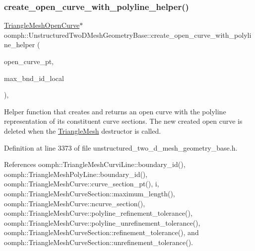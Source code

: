\subsubsection{\texorpdfstring{create\+\_\+open\+\_\+curve\+\_\+with\+\_\+polyline\+\_\+helper()}{create\_open\_curve\_with\_polyline\_helper()}}
{\footnotesize\ttfamily \hyperlink{classoomph_1_1TriangleMeshOpenCurve}{Triangle\+Mesh\+Open\+Curve}$\ast$ oomph\+::\+Unstructured\+Two\+D\+Mesh\+Geometry\+Base\+::create\+\_\+open\+\_\+curve\+\_\+with\+\_\+polyline\+\_\+helper (\begin{DoxyParamCaption}\item[{\hyperlink{classoomph_1_1TriangleMeshOpenCurve}{Triangle\+Mesh\+Open\+Curve} $\ast$}]{open\+\_\+curve\+\_\+pt,  }\item[{unsigned \&}]{max\+\_\+bnd\+\_\+id\+\_\+local }\end{DoxyParamCaption})\hspace{0.3cm}{\ttfamily [inline]}, {\ttfamily [protected]}}



Helper function that creates and returns an open curve with the polyline representation of its constituent curve sections. The new created open curve is deleted when the \hyperlink{classoomph_1_1TriangleMesh}{Triangle\+Mesh} destructor is called. 



Definition at line 3373 of file unstructured\+\_\+two\+\_\+d\+\_\+mesh\+\_\+geometry\+\_\+base.\+h.



References oomph\+::\+Triangle\+Mesh\+Curvi\+Line\+::boundary\+\_\+id(), oomph\+::\+Triangle\+Mesh\+Poly\+Line\+::boundary\+\_\+id(), oomph\+::\+Triangle\+Mesh\+Curve\+::curve\+\_\+section\+\_\+pt(), i, oomph\+::\+Triangle\+Mesh\+Curve\+Section\+::maximum\+\_\+length(), oomph\+::\+Triangle\+Mesh\+Curve\+::ncurve\+\_\+section(), oomph\+::\+Triangle\+Mesh\+Curve\+::polyline\+\_\+refinement\+\_\+tolerance(), oomph\+::\+Triangle\+Mesh\+Curve\+::polyline\+\_\+unrefinement\+\_\+tolerance(), oomph\+::\+Triangle\+Mesh\+Curve\+Section\+::refinement\+\_\+tolerance(), and oomph\+::\+Triangle\+Mesh\+Curve\+Section\+::unrefinement\+\_\+tolerance().

\mbox{\label{classoomph_1_1UnstructuredTwoDMeshGeometryBase_a22ba2b359eebe24f9ba1f40be54643d8}} 
